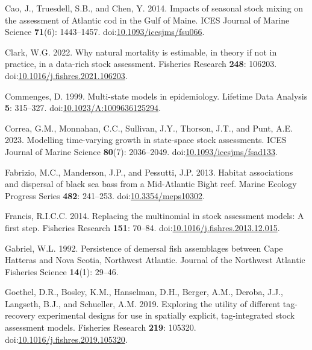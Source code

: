 \documentclass[
]{article}
\newlength{\cslhangindent}
\newlength{\cslentryspacingunit} %
\newenvironment{CSLReferences}[2] %
 {%
  \setlength{\parindent}{0pt}
  \ifodd #1
  \let\oldpar\par
  \def\par{\hangindent=\cslhangindent\oldpar}
  \fi
  \setlength{\parskip}{#2\cslentryspacingunit}
 }%
 {}
\begin{document}
\begin{CSLReferences}{1}{0}
\leavevmode{}%
Cao, J., Truesdell, S.B., and Chen, Y. 2014. Impacts of seasonal stock
mixing on the assessment of {A}tlantic cod in the {G}ulf of {M}aine.
ICES Journal of Marine Science \textbf{71}(6): 1443--1457.
doi:\href{https://doi.org/10.1093/icesjms/fsu066}{10.1093/icesjms/fsu066}.

\leavevmode{}%
Clark, W.G. 2022. Why natural mortality is estimable, in theory if not
in practice, in a data-rich stock assessment. Fisheries Research
\textbf{248}: 106203.
doi:\href{https://doi.org/10.1016/j.fishres.2021.106203}{10.1016/j.fishres.2021.106203}.

\leavevmode{}%
Commenges, D. 1999. Multi-state models in epidemiology. Lifetime Data
Analysis \textbf{5}: 315--327.
doi:\href{https://doi.org/10.1023/A:1009636125294}{10.1023/A:1009636125294}.

\leavevmode{}%
Correa, G.M., Monnahan, C.C., Sullivan, J.Y., Thorson, J.T., and Punt,
A.E. 2023. Modelling time-varying growth in state-space stock
assessments. ICES Journal of Marine Science \textbf{80}(7): 2036--2049.
doi:\href{https://doi.org/10.1093/icesjms/fsad133}{10.1093/icesjms/fsad133}.

\leavevmode{}%
Fabrizio, M.C., Manderson, J.P., and Pessutti, J.P. 2013. Habitat
associations and dispersal of black sea bass from a {M}id-{A}tlantic
{B}ight reef. Marine Ecology Progress Series \textbf{482}: 241--253.
doi:\href{https://doi.org/10.3354/meps10302}{10.3354/meps10302}.

\leavevmode{}%
Francis, R.I.C.C. 2014. Replacing the multinomial in stock assessment
models: A first step. Fisheries Research \textbf{151}: 70--84.
doi:\href{https://doi.org/10.1016/j.fishres.2013.12.015}{10.1016/j.fishres.2013.12.015}.

\leavevmode{}%
Gabriel, W.L. 1992. Persistence of demersal fish assemblages between
{C}ape {H}atteras and {N}ova {S}cotia, {N}orthwest {A}tlantic. Journal
of the Northwest Atlantic Fisheries Science \textbf{14}(1): 29--46.

\leavevmode{}%
Goethel, D.R., Bosley, K.M., Hanselman, D.H., Berger, A.M., Deroba,
J.J., Langseth, B.J., and Schueller, A.M. 2019. Exploring the utility of
different tag-recovery experimental designs for use in spatially
explicit, tag-integrated stock assessment models. Fisheries Research
\textbf{219}: 105320.
doi:\href{https://doi.org/10.1016/j.fishres.2019.105320}{10.1016/j.fishres.2019.105320}.


\end{CSLReferences}
\end{document}
